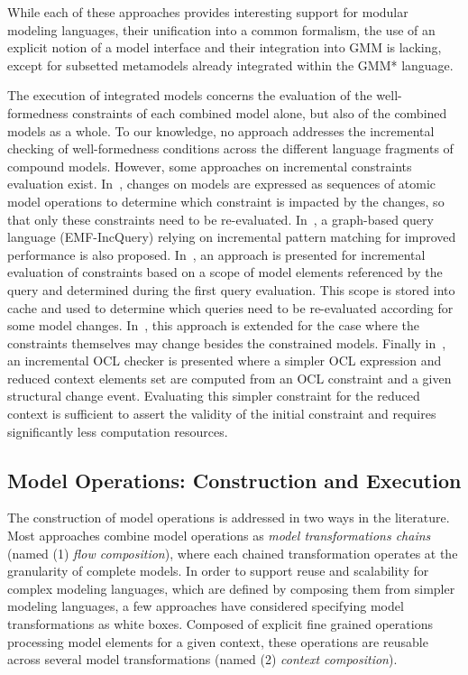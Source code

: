 While each of these approaches provides interesting support for modular modeling
languages, their unification into a common formalism, the use of an explicit
notion of a model interface and their integration into GMM is lacking, except
for subsetted metamodels already integrated within the GMM* language.

The execution of integrated models  concerns the evaluation of the
well-formedness constraints of each combined model alone, but also of the combined models as a whole. To our knowledge, no approach addresses the incremental checking of well-formedness conditions across the different language fragments of compound models. However, some approaches on incremental
constraints evaluation exist. In~\cite{1573497}, changes on models are expressed as sequences of atomic model operations to determine which constraint is impacted by the changes, so that only these constraints need to be re-evaluated. In~\cite{EMF-IncQuery-website, UjhelyiSCP2015},  a graph-based query language (EMF-IncQuery) relying on incremental pattern
matching for improved performance is also proposed. In~\cite{Egyed2006}, an
approach is presented for incremental evaluation of constraints based on a scope of model elements referenced by the query and determined during the first query evaluation. This scope is stored into cache and used to determine which queries need to be re-evaluated according for some model changes.
In~\cite{GroherFASE2010}, this approach is extended for the case where the constraints themselves may change besides the 
constrained models. Finally in~\cite{CT06}, an incremental OCL checker is presented where a simpler OCL expression and reduced context elements set are computed from an OCL constraint and a given structural change event. Evaluating this simpler constraint for the reduced context is sufficient to assert the validity of the initial constraint and requires significantly less computation resources.

\subsection{Model Operations: Construction and Execution}%
\label{subsec:mo_cae}%
%
The construction of model operations is addressed in two ways in the literature. Most approaches  combine model operations as \emph{model transformations chains} (named (1) \emph{flow composition}), where each chained transformation operates at the granularity of complete models. In order to support reuse and scalability for complex modeling languages, which are defined by composing them from simpler modeling languages, a few approaches have considered specifying model transformations as white boxes. Composed of explicit fine grained  operations processing model elements for a given context, these operations are reusable across several model transformations (named (2) \emph{context composition}).%

